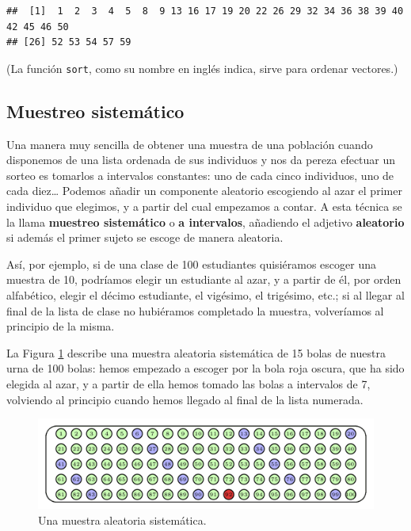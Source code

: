\documentclass[
]{book}
\theoremstyle{definition}
\theoremstyle{definition}
\theoremstyle{definition}
\theoremstyle{definition}
\theoremstyle{remark}
\begin{document}
\begin{verbatim}
##  [1]  1  2  3  4  5  8  9 13 16 17 19 20 22 26 29 32 34 36 38 39 40 42 45 46 50
## [26] 52 53 54 57 59
\end{verbatim}

(La función \texttt{sort}, como su nombre en inglés indica, sirve para ordenar vectores.)

\hypertarget{sec:sist}{%
\subsection{Muestreo sistemático}\label{sec:sist}}

Una manera muy sencilla de obtener una muestra de una población cuando disponemos de una lista ordenada de sus individuos y nos da pereza efectuar un sorteo es tomarlos a intervalos constantes: uno de cada cinco individuos, uno de cada diez\ldots{} Podemos añadir un componente aleatorio escogiendo al azar el primer individuo que elegimos, y a partir del cual empezamos a contar. A esta técnica se la llama \textbf{muestreo sistemático} o \textbf{a intervalos}, añadiendo el adjetivo \textbf{aleatorio} si además el primer sujeto se escoge de manera aleatoria.

Así, por ejemplo, si de una clase de 100 estudiantes quisiéramos escoger una muestra de 10, podríamos elegir un estudiante al azar, y a partir de él, por orden alfabético, elegir el décimo estudiante, el vigésimo, el trigésimo, etc.; si al llegar al final de la lista de clase no hubiéramos completado la muestra, volveríamos al principio de la misma.

La Figura \ref{fig:sist} describe una muestra aleatoria sistemática de 15 bolas de nuestra urna de 100 bolas: hemos empezado a escoger por la bola roja oscura, que ha sido elegida al azar, y a partir de ella hemos tomado las bolas a intervalos de 7, volviendo al principio cuando hemos llegado al final de la lista numerada.

\begin{figure}

{\centering \includegraphics[width=0.8\linewidth]{INREMDN_files/figure-html/sistv} 

}

\caption{Una muestra aleatoria sistemática.}\label{fig:sist}
\end{figure}
\end{document}
